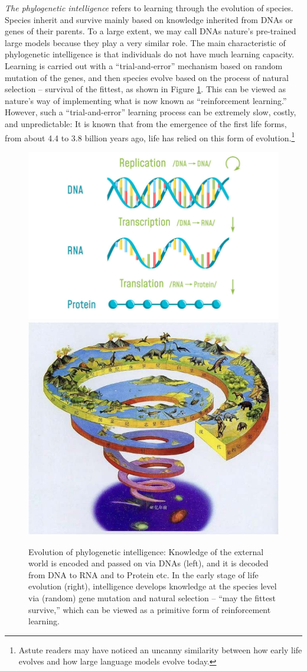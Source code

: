 \documentclass[../../book-main.tex]{subfiles}
\begin{document}
{\em The phylogenetic intelligence} refers to learning through the evolution of species. Species inherit and survive mainly based on knowledge inherited from DNAs or genes of their parents. To a large extent, we may call DNAs nature's pre-trained large models because they play a very similar role.  The main characteristic of phylogenetic intelligence is that individuals do not have much learning capacity. Learning is carried out with a ``trial-and-error'' mechanism based on random mutation of the genes, and then species evolve based on the process of natural selection -- survival of the fittest, as shown in Figure \ref{fig:phylogenetic}.
This can be viewed as nature's way of implementing what is now known as ``reinforcement learning.'' However, such a ``trial-and-error'' learning process can be extremely slow, costly, and unpredictable: It is known that from the emergence of the first life forms, from about 4.4 to 3.8 billion years ago, life has relied on this form of evolution.\footnote{Astute readers may have noticed an uncanny similarity between how early life evolves and how large language models evolve today.} 
\begin{figure}
    \centering
\includegraphics[width=0.5\linewidth]{figs_chap1/DNAs.png}
\includegraphics[width=0.40\linewidth]{figs_chap1/Evolution.jpg}
    \caption{Evolution of phylogenetic intelligence: Knowledge of the external world is encoded and passed on via DNAs (left), and it is decoded from DNA to RNA and to Protein etc. In the early stage of life evolution (right), intelligence develops knowledge at the species level via (random) gene mutation and natural selection -- ``may the fittest survive,'' which can be viewed as a primitive form of reinforcement learning.}
    \label{fig:phylogenetic}
\end{figure}
\end{document}
